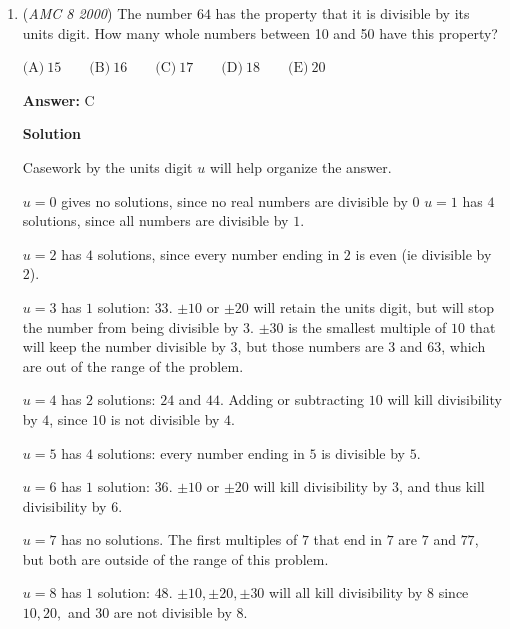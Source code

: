 \begin{enumerate}
\textbf{Solution}

Shea has grown $20\%$, if x was her original height, then $1.2x = 60$, so she was originally $\frac{60}{1.2}=50$ inches tall which is a $60 - 50 = 10$ inch increase.  Ara also started off at $50$ inches.  Since Ara grew half as much as Shea, Ara grew $\frac{10}{2} = 5$ inches.  Therefore, Ara is now $50+5=55$ inches tall which is choice $\boxed{E}.$



	\item (\textit{AMC 8 2000}) The number $64$ has the property that it is divisible by its units digit. How many whole numbers between 10 and 50 have this property?


 $\text{(A)}\ 15 \qquad \text{(B)}\ 16 \qquad \text{(C)}\ 17 \qquad \text{(D)}\ 18 \qquad \text{(E)}\ 20$

 \textbf{Answer: }C



\textbf{Solution}

Casework by the units digit $u$ will help organize the answer.

 $u=0$ gives no solutions, since no real numbers are divisible by $0$
$u=1$ has $4$ solutions, since all numbers are divisible by $1$.

 $u=2$ has $4$ solutions, since every number ending in $2$ is even (ie divisible by $2$).

 $u=3$ has $1$ solution: $33$.  $\pm 10$ or $\pm 20$ will retain the units digit, but will stop the number from being divisible by $3$.  $\pm 30$ is the smallest multiple of $10$ that will keep the number divisible by $3$, but those numbers are $3$ and $63$, which are out of the range of the problem.

 $u=4$ has $2$ solutions:  $24$ and $44$.  Adding or subtracting $10$ will kill divisibility by $4$, since $10$ is not divisible by $4$.

 $u=5$ has $4$ solutions:  every number ending in $5$ is divisible by $5$.

 $u=6$ has $1$ solution:  $36$.  $\pm 10$ or $\pm 20$ will kill divisibility by $3$, and thus kill divisibility by $6$.

 $u=7$ has no solutions.  The first multiples of $7$ that end in $7$ are $7$ and $77$, but both are outside of the range of this problem.

 $u=8$ has $1$ solution:  $48$.  $\pm 10, \pm 20, \pm 30$ will all kill divisibility by $8$ since $10, 20,$ and $30$ are not divisible by $8$.


\end{enumerate}
